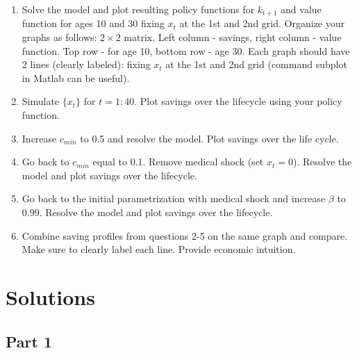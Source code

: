 \documentclass[10pt,a4paper]{article}
\begin{document}
\begin{enumerate}
    \item Solve the model and plot resulting policy functions for $k_{t+1}$ and value
function for ages 10 and 30 fixing $x_t$ at the 1st and 2nd grid.
Organize your graphs as follows: $2 \times 2$ matrix. Left column - savings,
right column - value function. Top row - for age 10, bottom row - age 30.
Each graph should have 2 lines (clearly labeled): fixing $x_t$ at the 1st and
2nd grid (command subplot in Matlab can be useful).

    \item Simulate $\{x_t\}$ for $t = 1 : 40$. Plot savings over the lifecycle using your
policy function.

    \item Increase $c_{min}$ to 0.5 and resolve the model. Plot savings over the life
cycle.

    \item Go back to $c_{min}$ equal to 0.1. Remove medical shock (set $x_t = 0$).
Resolve the model and plot savings over the lifecycle.

    \item Go back to the initial parametrization with medical shock and increase
$\beta$ to 0.99. Resolve the model and plot savings over the lifecycle.

    \item Combine saving profiles from questions 2-5 on the same graph and
compare. Make sure to clearly label each line. Provide economic intuition.
\end{enumerate}

\section*{Solutions}
\subsection*{Part 1}
\end{document}
